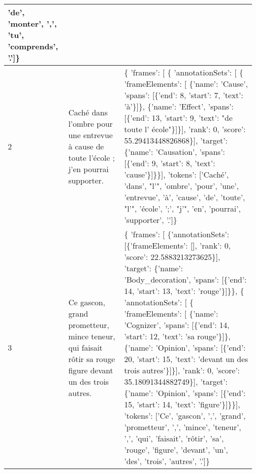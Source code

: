 \documentclass{article}%
\begin{document}
\begin{longtable}{|l |p{5.5cm} |p{9cm}|}
              'de', 'monter', ',', 'tu', 'comprends', '.'{]}\}\\%
\hline%
\rowcolor{lightgray}%
2&Caché dans l'ombre pour une entrevue à cause de toute l'école ; j'en pourrai supporter.&\{ 'frames': {[} \{ 'annotationSets': {[} \{ 'frameElements': {[} \{'name': 'Cause', 'spans': {[}\{'end': 8, 'start': 7, 'text': 'à'\}{]}\},\newline%
                                                         \{'name': 'Effect', 'spans': {[}\{'end': 13, 'start': 9, 'text': "de toute l' école"\}{]}\}{]},\newline%
                                      'rank': 0,\newline%
                                      'score': 55.29413448826868\}{]},\newline%
                'target': \{'name': 'Causation', 'spans': {[}\{'end': 9, 'start': 8, 'text': 'cause'\}{]}\}\}{]},\newline%
  'tokens': {[}'Caché', 'dans', "l'", 'ombre', 'pour', 'une', 'entrevue', 'à', 'cause', 'de', 'toute', "l'", 'école', ';', "j'", 'en', 'pourrai', 'supporter', '.'{]}\}\\%
\hline%
\rowcolor{lightgray}%
3&Ce gascon, grand prometteur, mince teneur, qui faisait rôtir sa rouge figure devant un des trois autres.&\{ 'frames': {[} \{'annotationSets': {[}\{'frameElements': {[}{]}, 'rank': 0, 'score': 22.5883213273625\}{]}, 'target': \{'name': 'Body\_decoration', 'spans': {[}\{'end': 14, 'start': 13, 'text': 'rouge'\}{]}\}\},\newline%
              \{ 'annotationSets': {[} \{ 'frameElements': {[} \{'name': 'Cognizer', 'spans': {[}\{'end': 14, 'start': 12, 'text': 'sa rouge'\}{]}\},\newline%
                                                         \{'name': 'Opinion', 'spans': {[}\{'end': 20, 'start': 15, 'text': 'devant un des trois autres'\}{]}\}{]},\newline%
                                      'rank': 0,\newline%
                                      'score': 35.18091344882749\}{]},\newline%
                'target': \{'name': 'Opinion', 'spans': {[}\{'end': 15, 'start': 14, 'text': 'figure'\}{]}\}\}{]},\newline%
  'tokens': {[}'Ce', 'gascon', ',', 'grand', 'prometteur', ',', 'mince', 'teneur', ',', 'qui', 'faisait', 'rôtir', 'sa', 'rouge', 'figure', 'devant', 'un', 'des', 'trois', 'autres', '.'{]}\}\\%

\end{longtable}
\end{document}
